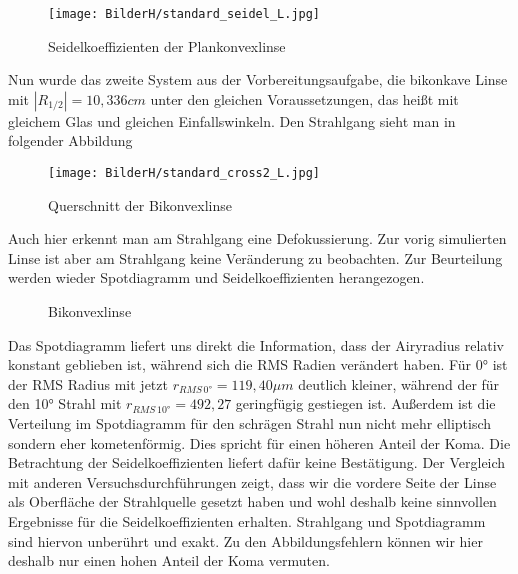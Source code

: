 \documentclass[twoside,colorback,accentcolor=tud4c,11pt]{tudreport}
\begin{document}
\begin{figure}[H]
\centering
   	\begin{minipage}[b]{\textwidth}
\centering   	\texttt{[image: BilderH/standard\_seidel\_L.jpg]}
   	\caption{Seidelkoeffizienten der Plankonvexlinse}
  	\end{minipage}
\end{figure}
	
	Nun wurde das zweite System aus der Vorbereitungsaufgabe, die bikonkave Linse mit $|R_{1/2}| = 10,336 cm$ unter den gleichen Voraussetzungen, das heißt mit gleichem Glas und gleichen Einfallswinkeln. Den Strahlgang sieht man in folgender Abbildung 
	
	\begin{figure}[H]
\centering
   	\begin{minipage}[b]{\textwidth}
\centering   	\texttt{[image: BilderH/standard\_cross2\_L.jpg]}
   	\caption{Querschnitt der Bikonvexlinse}
  	\end{minipage}
\end{figure}
	
	Auch hier erkennt man am Strahlgang eine Defokussierung. Zur vorig simulierten Linse ist aber am Strahlgang keine Veränderung zu beobachten. Zur Beurteilung werden wieder Spotdiagramm und Seidelkoeffizienten herangezogen.
	
	\begin{figure}[H]
\centering
  \quad
  \quad   
  \caption{Bikonvexlinse}
\end{figure}
	
	Das Spotdiagramm liefert uns direkt die Information, dass der Airyradius relativ konstant geblieben ist, während sich die RMS Radien verändert haben. Für 0° ist der RMS Radius mit jetzt $r_{RMS \, 0°} = 119,40 \mu m $ deutlich kleiner, während der für den 10° Strahl mit $r_{RMS \, 10°} = 492,27 $ geringfügig gestiegen ist. Außerdem ist die Verteilung im Spotdiagramm für den schrägen Strahl nun nicht mehr elliptisch sondern eher kometenförmig. Dies spricht für einen höheren Anteil der Koma. Die Betrachtung der Seidelkoeffizienten liefert dafür keine Bestätigung. Der Vergleich mit anderen Versuchsdurchführungen zeigt, dass wir die vordere Seite der Linse als Oberfläche der Strahlquelle gesetzt haben und wohl deshalb keine sinnvollen Ergebnisse für die Seidelkoeffizienten erhalten. Strahlgang und Spotdiagramm sind hiervon unberührt und exakt. 
	Zu den Abbildungsfehlern können wir hier deshalb nur einen hohen Anteil der Koma vermuten.
	
\end{document}

